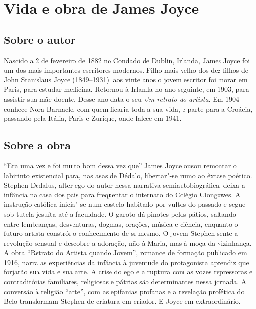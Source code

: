 \chapter{Vida e obra de James Joyce}

\section{Sobre o autor}

Nascido a 2 de fevereiro de 1882 no Condado de Dublin, Irlanda, James Joyce foi um dos mais importantes escritores modernos. Filho mais velho dos dez filhos de John Stanislaus Joyce (1849--1931), aos vinte anos o jovem escritor foi morar em Paris, para estudar medicina. Retornou à Irlanda no ano seguinte, em 1903, para assistir sua mãe doente. Desse ano data o seu \emph{Um retrato do artista}. 
Em 1904 conhece Nora Barnacle, com quem ficaria toda a sua vida, e parte para a Croácia, passando pela Itália, Paris e Zurique, onde falece em 1941.


\section{Sobre a obra}

``Era uma vez e foi muito bom dessa vez que'' James Joyce ousou remontar
o labirinto existencial para, nas asas de Dédalo, libertar"-se rumo ao
êxtase poético. Stephen Dedalus, alter ego do autor nessa narrativa
semiautobiográfica, deixa a infância na casa dos pais para frequentar o
internato do Colégio Clongowes. A instrução católica inicia"-se num
castelo habitado por vultos do passado e segue sob tutela jesuíta até a
faculdade. O garoto dá pinotes pelos pátios, saltando entre lembranças,
desventuras, dogmas, orações, música e ciência, enquanto o futuro
artista constrói o conhecimento de si mesmo. O jovem Stephen sente a
revolução sensual e descobre a adoração, não à Maria, mas à moça da
vizinhança. A obra ``Retrato do Artista quando Jovem'', romance de
formação publicado em 1916, narra as experiências da infância à
juventude do protagonista aprendiz que forjarão sua vida e sua arte. A
crise do ego e a ruptura com as vozes repressoras e contraditórias
familiares, religiosas e pátrias são determinantes nessa jornada. A
conversão à religião ``arte'', com as epifanias profanas e a revelação
profética do Belo transformam Stephen de criatura em criador. E Joyce em
extraordinário.

